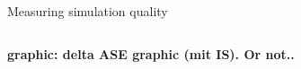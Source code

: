 \autobookmark
\begin{frame}{Measuring simulation quality}
  \begin{columns}[T]

    \begin{column}{.3\textwidth}
      \textbf{graphic: delta ASE graphic (mit IS). Or not..}
    \end{column}

    \begin{column}{.7\textwidth}
      \begin{itemize}
      \end{itemize}
    \end{column}


  \end{columns}

\end{frame}


